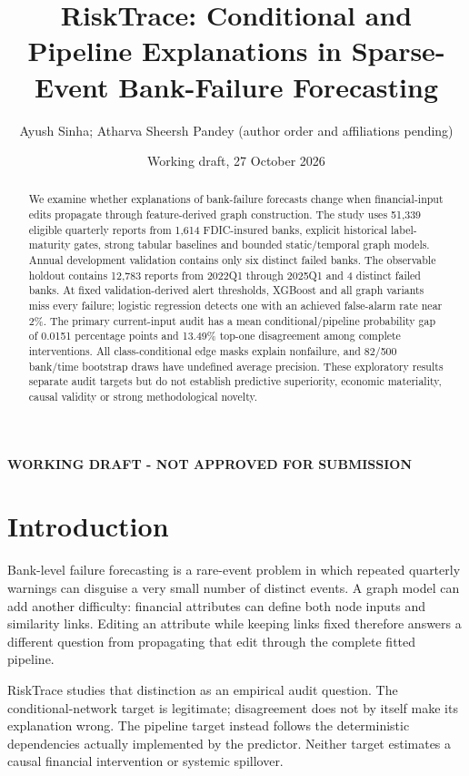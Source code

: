 \documentclass[11pt]{article}
\title{RiskTrace: Conditional and Pipeline Explanations in Sparse-Event Bank-Failure Forecasting}
\author{Ayush Sinha; Atharva Sheersh Pandey (author order and affiliations pending)}
\date{Working draft, 27 October 2026}
\begin{document}
\maketitle
\begin{center}\textbf{WORKING DRAFT - NOT APPROVED FOR SUBMISSION}\end{center}
\begin{abstract}We examine whether explanations of bank-failure forecasts change when financial-input edits propagate through feature-derived graph construction. The study uses 51,339 eligible quarterly reports from 1,614 FDIC-insured banks, explicit historical label-maturity gates, strong tabular baselines and bounded static/temporal graph models. Annual development validation contains only six distinct failed banks. The observable holdout contains 12,783 reports from 2022Q1 through 2025Q1 and 4 distinct failed banks. At fixed validation-derived alert thresholds, XGBoost and all graph variants miss every failure; logistic regression detects one with an achieved false-alarm rate near 2\%. The primary current-input audit has a mean conditional/pipeline probability gap of 0.0151 percentage points and 13.49\% top-one disagreement among complete interventions. All class-conditional edge masks explain nonfailure, and 82/500 bank/time bootstrap draws have undefined average precision. These exploratory results separate audit targets but do not establish predictive superiority, economic materiality, causal validity or strong methodological novelty.\end{abstract}
\section{Introduction}
Bank-level failure forecasting is a rare-event problem in which repeated quarterly warnings can disguise a very small number of distinct events. A graph model can add another difficulty: financial attributes can define both node inputs and similarity links. Editing an attribute while keeping links fixed therefore answers a different question from propagating that edit through the complete fitted pipeline.

RiskTrace studies that distinction as an empirical audit question. The conditional-network target is legitimate; disagreement does not by itself make its explanation wrong. The pipeline target instead follows the deterministic dependencies actually implemented by the predictor. Neither target estimates a causal financial intervention or systemic spillover.
\end{document}
